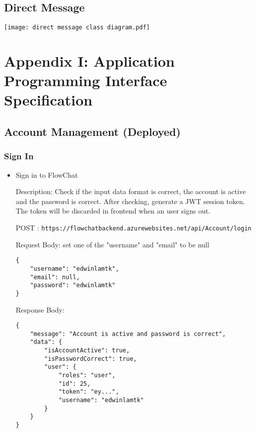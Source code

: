 \documentclass[11pt, a4paper]{article}
\begin{document}
\subsection{Direct Message}
\begin{center}
    \texttt{[image: direct message class diagram.pdf]}
\end{center}

\newpage
\section{Appendix I: Application Programming Interface Specification}
\label{sec:api_spec}
\subsection{Account Management (Deployed)}
\subsubsection{Sign In}
\begin{itemize}
\item Sign in to FlowChat

Description: Check if the input data format is correct, the account is active and the password is correct. After checking, generate a JWT session token. The token will be discarded in frontend when an user signs out.

POST :  \texttt{https://flowchatbackend.azurewebsites.net/api/Account/login}

Request Body: set one of the "username" and "email" to be null
    \begin{lstlisting}[breaklines=true, frame=single]
{
    "username": "edwinlamtk",
    "email": null,
    "password": "edwinlamtk"
}
    \end{lstlisting}

    Response Body:
    \begin{lstlisting}[breaklines=true, frame=single]
{
    "message": "Account is active and password is correct",
    "data": {
        "isAccountActive": true,
        "isPasswordCorrect": true,
        "user": {
            "roles": "user",
            "id": 25,
            "token": "ey...",
            "username": "edwinlamtk"
        }
    }
}
    \end{lstlisting}

\end{itemize}
\end{document}
